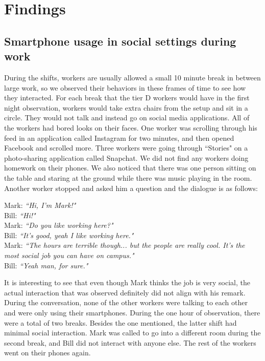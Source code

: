\documentclass[letterpaper, 12pt]{report}
\begin{document}
	\section{Findings}
	\subsection{Smartphone usage in social settings during work}
	During the shifts, workers are usually allowed a small 10 minute break in between large work, so we observed their behaviors in these frames of time to see how they interacted. For each break that the tier D workers would have in the first night observation, workers would take extra chairs from the setup and sit in a circle. They would not talk and instead go on social media applications. All of the workers had bored looks on their faces. One worker was scrolling through his feed in an application called Instagram for two minutes, and then opened Facebook and scrolled more. Three workers were going through ``Stories" on a photo-sharing application called Snapchat. We did not find any workers doing homework on their phones. We also noticed that there was one person sitting on the table and staring at the ground while there was music playing in the room. Another worker stopped and asked him a question and the dialogue is as follows:
	\begin{displayquote}
		Mark: \textit{``Hi, I'm Mark!"}\\
		Bill: \textit{``Hi!"}\\
		Mark: \textit{``Do you like working here?"}\\
		Bill: \textit{``It's good, yeah I like working here."}\\
		Mark: \textit{``The hours are terrible though... but the people are really cool. It's the most social job you can have on campus."}\\
		Bill: \textit{``Yeah man, for sure."}
	\end{displayquote}
	
	It is interesting to see that even though Mark thinks the job is very social, the actual interaction that was observed definitely did not align with his remark. During the conversation, none of the other workers were talking to each other and were only using their smartphones. During the one hour of observation, there were a total of two breaks. Besides the one mentioned, the latter shift had minimal social interaction. Mark was called to go into a different room during the second break, and Bill did not interact with anyone else. The rest of the workers went on their phones again.\\
	
\end{document}
